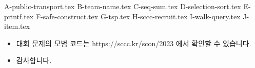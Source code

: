     {A-public-transport.tex}
    {B-team-name.tex}
    {C-seq-sum.tex}
    {D-selection-sort.tex}
    {E-printf.tex}
    {F-safe-construct.tex}
    {G-tsp.tex}
    {H-sccc-recruit.tex}
    {I-walk-query.tex}
    {J-item.tex}
    
    \begin{frame} %
        \begin{itemize}
            \item 대회 문제의 모범 코드는 https://sccc.kr/scon/2023 에서 확인할 수 있습니다.
            \item 감사합니다.
        \end{itemize}
    \end{frame}

